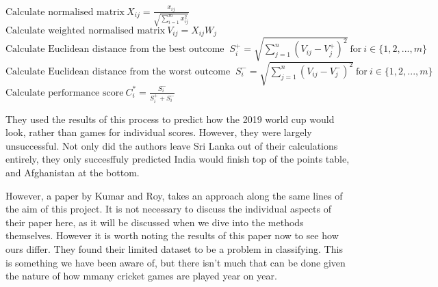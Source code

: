 \begin{algorithmic}[1]
    \State $\text{Calculate normalised matrix} \ X_{ij} = \frac{x_{ij}}{\sqrt{\sum_{i=1}^mx_{ij}^2}}$
    \State $\text{Calculate weighted normalised matrix} \ V_{ij}=X_{ij}W_j$
    \State $\text{Calculate Euclidean distance from the best outcome } \ S_i^+ = \sqrt{\sum_{j=1}^n(V_{ij}-V_j^+)^2} \ \text{for} \ i \in \{1,2,...,m\}$
    \State $\text{Calculate Euclidean distance from the worst outcome } \ S_i^- = \sqrt{\sum_{j=1}^n(V_{ij}-V_j^-)^2} \ \text{for} \ i \in \{1,2,...,m\}$
    \State $\text{Calculate performance score} \ C_i^* = \frac{S_i^-}{S_i^+  + S_i^-}$
\end{algorithmic}

They used the results of this process to predict how the 2019 world cup would look, rather than games for individual scores. However, they were largely unsuccessful. 
Not only did the authors leave Sri Lanka out of their calculations entirely, they only succesffuly predicted India would finish top of the points table, and Afghanistan 
at the bottom. 

However, a paper by Kumar and Roy, \cite{kumar} takes an approach along the same lines of the aim of this project. It is not necessary to discuss the individual aspects
of their paper here, as it will be discussed when we dive into the methods themselves. However it is worth noting the results of this paper now to see how
ours differ. They found their limited dataset to be a problem in classifying. This is something we have been aware of, but there isn't much that can be done
given the nature of how mmany cricket games are played year on year. 